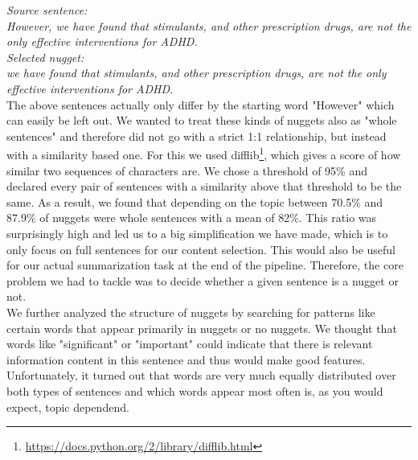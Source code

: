 \textit{Source sentence:} \\ 
\textit{However, we have found that stimulants, and other prescription drugs, are not the only effective interventions for ADHD.} \\

\textit{Selected nugget:} \\
\textit{we have found that stimulants, and other prescription drugs, are not the only effective interventions for ADHD.} \\

The above sentences actually only differ by the starting word "However" which can easily be left out. We wanted to treat these kinds of nuggets also as "whole sentences" and therefore did not go with a strict 1:1 relationship, but instead with a similarity based one. For this we used difflib\footnote[1]{\url{https://docs.python.org/2/library/difflib.html}}, which gives a score of how similar two sequences of characters are. We chose a threshold of 95\% and declared every pair of sentences with a similarity above that threshold to be the same. As a result, we found that depending on the topic between 70.5\% and 87.9\% of nuggets were whole sentences with a mean of 82\%. This ratio was surprisingly high and led us to a big simplification we have made, which is to only focus on full sentences for our content selection. This would also be useful for our actual summarization task at the end of the pipeline. Therefore, the core problem we had to tackle was to decide whether a given sentence is a nugget or not.\\
We further analyzed the structure of nuggets by searching for patterns like certain words that appear primarily in nuggets or no nuggets. We thought that words like "significant" or "important" could indicate that there is relevant information content in this sentence and thus would make good features. Unfortunately, it turned out that words are very much equally distributed over both types of sentences and which words appear most often is, as you would expect, topic dependend.


